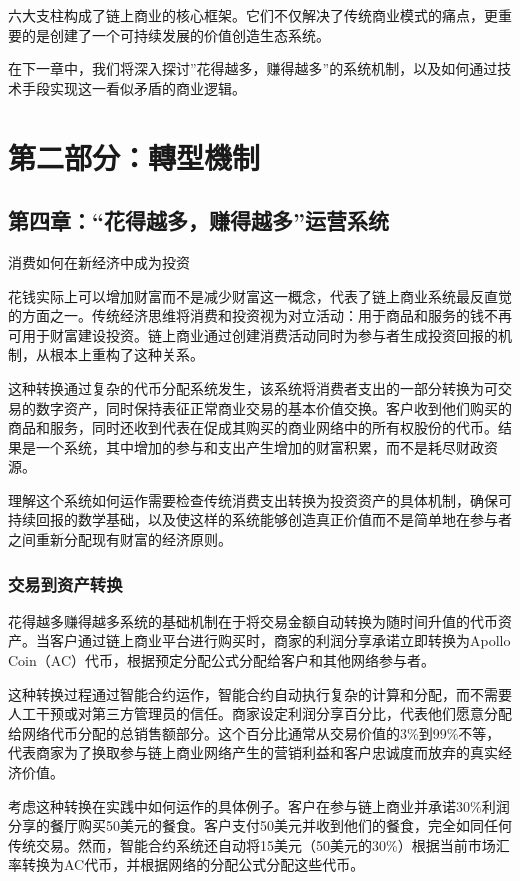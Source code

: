 \documentclass[
  Letterpaper,
]{scrbook}
\begin{document}
六大支柱构成了链上商业的核心框架。它们不仅解决了传统商业模式的痛点，更重要的是创建了一个可持续发展的价值创造生态系统。

在下一章中，我们将深入探讨''花得越多，赚得越多''的系统机制，以及如何通过技术手段实现这一看似矛盾的商业逻辑。

\part{第二部分：轉型機制}

\chapter{第四章：``花得越多，赚得越多''运营系统}\label{sec-spend-earn-system}

消费如何在新经济中成为投资

花钱实际上可以增加财富而不是减少财富这一概念，代表了链上商业系统最反直觉的方面之一。传统经济思维将消费和投资视为对立活动：用于商品和服务的钱不再可用于财富建设投资。链上商业通过创建消费活动同时为参与者生成投资回报的机制，从根本上重构了这种关系。

这种转换通过复杂的代币分配系统发生，该系统将消费者支出的一部分转换为可交易的数字资产，同时保持表征正常商业交易的基本价值交换。客户收到他们购买的商品和服务，同时还收到代表在促成其购买的商业网络中的所有权股份的代币。结果是一个系统，其中增加的参与和支出产生增加的财富积累，而不是耗尽财政资源。

理解这个系统如何运作需要检查传统消费支出转换为投资资产的具体机制，确保可持续回报的数学基础，以及使这样的系统能够创造真正价值而不是简单地在参与者之间重新分配现有财富的经济原则。

\section{交易到资产转换}\label{ux4ea4ux6613ux5230ux8d44ux4ea7ux8f6cux6362}

花得越多赚得越多系统的基础机制在于将交易金额自动转换为随时间升值的代币资产。当客户通过链上商业平台进行购买时，商家的利润分享承诺立即转换为Apollo
Coin（AC）代币，根据预定分配公式分配给客户和其他网络参与者。

这种转换过程通过智能合约运作，智能合约自动执行复杂的计算和分配，而不需要人工干预或对第三方管理员的信任。商家设定利润分享百分比，代表他们愿意分配给网络代币分配的总销售额部分。这个百分比通常从交易价值的3\%到99\%不等，代表商家为了换取参与链上商业网络产生的营销利益和客户忠诚度而放弃的真实经济价值。

考虑这种转换在实践中如何运作的具体例子。客户在参与链上商业并承诺30\%利润分享的餐厅购买50美元的餐食。客户支付50美元并收到他们的餐食，完全如同任何传统交易。然而，智能合约系统还自动将15美元（50美元的30\%）根据当前市场汇率转换为AC代币，并根据网络的分配公式分配这些代币。
\end{document}

